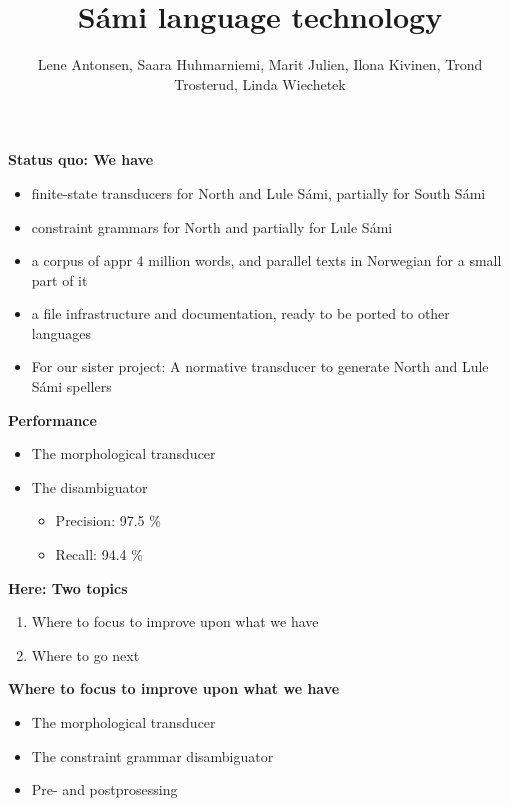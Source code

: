 \documentclass[landscape,english,11pt]{seminar}
\title{Sámi language technology}
\author{Lene Antonsen, 
Saara Huhmarniemi, 
Marit Julien, 
Ilona Kivinen, 
Trond Trosterud, 
Linda Wiechetek}
\begin{document}
\begin{slide}

\maketitle

\newslide
\textbf{Status quo: We have}
\begin{itemize}
\item finite-state transducers for North and Lule Sámi, partially for South Sámi
\item constraint grammars for North and partially for Lule Sámi
\item a corpus of appr 4 million words, and parallel texts in Norwegian for a small part of it
\item a file infrastructure and documentation, ready to be ported to other languages
\item For our sister project: A normative transducer to generate North and Lule Sámi spellers
\end{itemize}


\newslide
\textbf{Performance}
\begin{itemize}
\item The morphological transducer
\item The disambiguator
\begin{itemize}
\item Precision: 97.5 \%
\item Recall: 94.4 \%
\end{itemize}
\end{itemize}

\newslide
\textbf{Here: Two topics}
\begin{enumerate}
\item Where to focus to improve upon what we have
\item Where to go next
\end{enumerate}


\newslide
\textbf{Where to focus to improve upon what we have}
\begin{itemize}
\item The morphological transducer
\item The constraint grammar disambiguator
\item Pre- and postprosessing
\end{itemize}




\end{slide}
\end{document}
